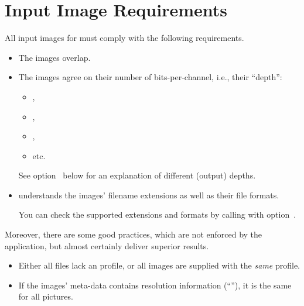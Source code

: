 

\section[Image Requirements]{Input Image Requirements
  \label{sec:image-requirements}
  }

All input images for \App{} must comply with the following
requirements.

\begin{itemize}
\item
  The images overlap.

\item
  The images agree on their number of bits-per-channel, i.e., their
  ``depth'':
  \begin{itemize}
  \item
    ,
  \item
    ,
  \item
    ,
  \item
    etc.
  \end{itemize}

  See option~ below for an explanation of different
  (output) depths.

\item
  \App{} understands the images' filename extensions as well as their
  file formats.

  You can check the supported extensions and formats by calling \App{}
  with option~.
\end{itemize}

Moreover, there are some good practices, which are not enforced by the
application, but almost certainly deliver superior results.

\begin{itemize}
\item
  Either all files lack an  profile, or all images are
  supplied with the \emph{same}  profile.

\item
  If the images' meta-data contains resolution information
  (``''), it is the same for all pictures.
\end{itemize}
